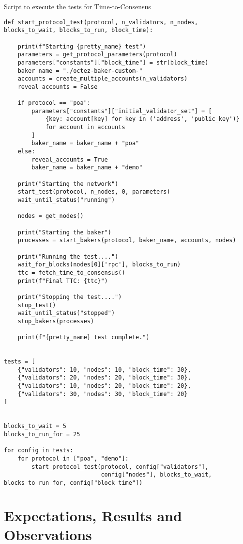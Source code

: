 \begin{listing}[H]
\caption{Script to execute the tests for Time-to-Consensus}
\label{lst:python_code}
\begin{verbatim}
def start_protocol_test(protocol, n_validators, n_nodes, blocks_to_wait, blocks_to_run, block_time):

    print(f"Starting {pretty_name} test")
    parameters = get_protocol_parameters(protocol)
    parameters["constants"]["block_time"] = str(block_time)
    baker_name = "./octez-baker-custom-"
    accounts = create_multiple_accounts(n_validators)
    reveal_accounts = False

    if protocol == "poa":
        parameters["constants"]["initial_validator_set"] = [
            {key: account[key] for key in ('address', 'public_key')}
            for account in accounts
        ]
        baker_name = baker_name + "poa"
    else:
        reveal_accounts = True
        baker_name = baker_name + "demo"

    print("Starting the network")
    start_test(protocol, n_nodes, 0, parameters)
    wait_until_status("running")

    nodes = get_nodes()

    print("Starting the baker")
    processes = start_bakers(protocol, baker_name, accounts, nodes)

    print("Running the test....")
    wait_for_blocks(nodes[0]['rpc'], blocks_to_run)
    ttc = fetch_time_to_consensus()
    print(f"Final TTC: {ttc}")

    print("Stopping the test....")
    stop_test()
    wait_until_status("stopped")
    stop_bakers(processes)

    print(f"{pretty_name} test complete.")


tests = [
    {"validators": 10, "nodes": 10, "block_time": 30},
    {"validators": 20, "nodes": 20, "block_time": 30},
    {"validators": 10, "nodes": 20, "block_time": 20},
    {"validators": 30, "nodes": 30, "block_time": 20}
]


blocks_to_wait = 5
blocks_to_run_for = 25

for config in tests:
    for protocol in ["poa", "demo"]:
        start_protocol_test(protocol, config["validators"],
                            config["nodes"], blocks_to_wait, blocks_to_run_for, config["block_time"])
\end{verbatim}
\end{listing}


\section*{Expectations, Results and Observations}

